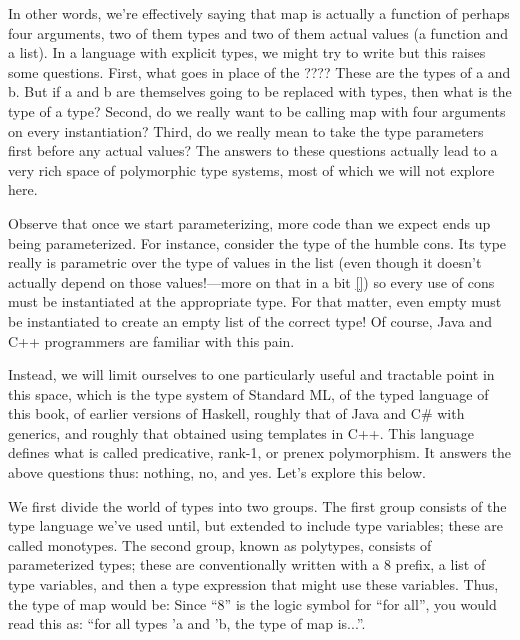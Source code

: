 
In other words, we’re effectively saying that map is actually a function of
perhaps four arguments, two of them types and two of them actual values (a
function and a list). In a language with explicit types, we might try to write
but this raises some questions. First, what goes in place of the ???? These are
the types of a and b. But if a and b are themselves going to be replaced with
types, then what is the type of a type? Second, do we really want to be calling
map with four arguments on every instantiation? Third, do we really mean to take
the type parameters first before any actual values? The answers to these
questions actually lead to a very rich space of polymorphic type systems, most
of which we will not explore here.

Observe that once we start parameterizing, more code than we expect ends up
being parameterized. For instance, consider the type of the humble cons. Its
type really is parametric over the type of values in the list (even though it
doesn’t actually depend on those values!—more on that in a bit \ref{}) so every
use of cons must be instantiated at the appropriate type. For that matter, even
empty must be instantiated to create an empty list of the correct type! Of
course, Java and C++ programmers are familiar with this pain.


Instead, we will limit ourselves to one particularly useful and tractable point
in this space, which is the type system of Standard ML, of the typed language of
this book, of earlier versions of Haskell, roughly that of Java and C\# with
generics, and roughly that obtained using templates in C++. This language
defines what is called predicative, rank-1, or prenex polymorphism. It answers
the above questions thus: nothing, no, and yes. Let’s explore this below.

We first divide the world of types into two groups. The first group consists of
the type language we’ve used until, but extended to include type variables;
these are called monotypes. The second group, known as polytypes, consists of
parameterized types; these are conventionally written with a 8 prefix, a list of
type variables, and then a type expression that might use these variables. Thus,
the type of map would be:
Since “8” is the logic symbol for “for all”, you would read this as: “for all
types 'a and 'b, the type of map is...”.

